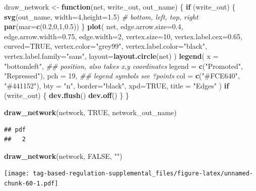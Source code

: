 \documentclass[
]{book}
\newenvironment{Shaded}{\begin{snugshade}}{\end{snugshade}}
\newcommand{\CommentTok}[1]{\textcolor[rgb]{0.56,0.35,0.01}{\textit{#1}}}
\newcommand{\ControlFlowTok}[1]{\textcolor[rgb]{0.13,0.29,0.53}{\textbf{#1}}}
\newcommand{\DataTypeTok}[1]{\textcolor[rgb]{0.13,0.29,0.53}{#1}}
\newcommand{\DecValTok}[1]{\textcolor[rgb]{0.00,0.00,0.81}{#1}}
\newcommand{\FloatTok}[1]{\textcolor[rgb]{0.00,0.00,0.81}{#1}}
\newcommand{\KeywordTok}[1]{\textcolor[rgb]{0.13,0.29,0.53}{\textbf{#1}}}
\newcommand{\NormalTok}[1]{#1}
\newcommand{\OtherTok}[1]{\textcolor[rgb]{0.56,0.35,0.01}{#1}}
\newcommand{\StringTok}[1]{\textcolor[rgb]{0.31,0.60,0.02}{#1}}
\begin{document}
\begin{Shaded}
\begin{Highlighting}[]
\NormalTok{draw\_network \textless{}{-}}\StringTok{ }\ControlFlowTok{function}\NormalTok{(net, write\_out, out\_name) \{}
  \ControlFlowTok{if}\NormalTok{ (write\_out) \{}
    \KeywordTok{svg}\NormalTok{(out\_name, }\DataTypeTok{width=}\DecValTok{4}\NormalTok{,}\DataTypeTok{height=}\FloatTok{1.5}\NormalTok{)}
    \CommentTok{\# bottom, left, top, right}
    \KeywordTok{par}\NormalTok{(}\DataTypeTok{mar=}\KeywordTok{c}\NormalTok{(}\FloatTok{0.2}\NormalTok{,}\DecValTok{0}\NormalTok{,}\DecValTok{1}\NormalTok{,}\FloatTok{0.5}\NormalTok{))}
\NormalTok{  \}}
  \KeywordTok{plot}\NormalTok{(}
\NormalTok{    net,}
    \DataTypeTok{edge.arrow.size=}\FloatTok{0.4}\NormalTok{,}
    \DataTypeTok{edge.arrow.width=}\FloatTok{0.75}\NormalTok{,}
    \DataTypeTok{edge.width=}\DecValTok{2}\NormalTok{,}
    \DataTypeTok{vertex.size=}\DecValTok{10}\NormalTok{,}
    \DataTypeTok{vertex.label.cex=}\FloatTok{0.65}\NormalTok{,}
    \DataTypeTok{curved=}\OtherTok{TRUE}\NormalTok{,}
    \DataTypeTok{vertex.color=}\StringTok{"grey99"}\NormalTok{,}
    \DataTypeTok{vertex.label.color=}\StringTok{"black"}\NormalTok{,}
    \DataTypeTok{vertex.label.family=}\StringTok{"sans"}\NormalTok{,}
    \DataTypeTok{layout=}\KeywordTok{layout.circle}\NormalTok{(net)}
\NormalTok{  )}
  \KeywordTok{legend}\NormalTok{(}
    \DataTypeTok{x =} \StringTok{"bottomleft"}\NormalTok{,      }\CommentTok{\#\# position, also takes x,y coordinates}
    \DataTypeTok{legend =} \KeywordTok{c}\NormalTok{(}\StringTok{"Promoted"}\NormalTok{, }\StringTok{"Repressed"}\NormalTok{),}
    \DataTypeTok{pch =} \DecValTok{19}\NormalTok{,              }\CommentTok{\#\# legend symbols see ?points}
    \DataTypeTok{col =} \KeywordTok{c}\NormalTok{(}\StringTok{"\#FCE640"}\NormalTok{, }\StringTok{"\#441152"}\NormalTok{),}
    \DataTypeTok{bty =} \StringTok{"n"}\NormalTok{,}
    \DataTypeTok{border=}\StringTok{"black"}\NormalTok{,}
    \DataTypeTok{xpd=}\OtherTok{TRUE}\NormalTok{,}
    \DataTypeTok{title =} \StringTok{"Edges"}
\NormalTok{  )}
  \ControlFlowTok{if}\NormalTok{ (write\_out) \{}
    \KeywordTok{dev.flush}\NormalTok{()}
    \KeywordTok{dev.off}\NormalTok{()}
\NormalTok{  \}}
\NormalTok{\}}

\KeywordTok{draw\_network}\NormalTok{(network, }\OtherTok{TRUE}\NormalTok{, network\_out\_name)}
\end{Highlighting}
\end{Shaded}

\begin{verbatim}
## pdf 
##   2
\end{verbatim}

\begin{Shaded}
\begin{Highlighting}[]
\KeywordTok{draw\_network}\NormalTok{(network, }\OtherTok{FALSE}\NormalTok{, }\StringTok{""}\NormalTok{)}
\end{Highlighting}
\end{Shaded}

\texttt{[image: tag-based-regulation-supplemental\_files/figure-latex/unnamed-chunk-60-1.pdf]}
\end{document}
